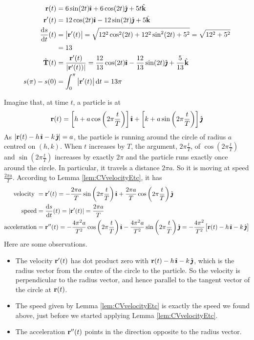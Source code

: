 \begin{eg}
\begin{align*}
\vr(t) &= 6\sin(2t)\hi + 6\cos(2t)\hj +5t\hk \\
\vr'(t) &= 12\cos(2t)\hi -12\sin(2t)\hj +5\hk \\
\diff{s}{t}(t)&=\big|\vr'(t)\big| 
=\sqrt{12^2\cos^2(2t) +12^2\sin^2(2t)+5^2}
= \sqrt{12^2+5^2}\\
& = 13\\
\hat\vT(t) &= \frac{\vr'(t)}{|\vr'(t))|}
               =  \frac{12}{13}\cos(2t)\hi -\frac{12}{13}\sin(2t)\hj +\frac{5}{13}\hk \\
s(\pi)-s(0)&= \int_{0}^\pi \big|\vr'(t)\big|\,\dee{t}
          =13\pi
\end{align*}
\end{eg}

\begin{eg}\label{eg:velAccel}
Imagine that, at time $t$, a particle is at 
\begin{equation*}
\mathbf{r}(t) = \left[h+a\cos\left(2\pi\frac{t}{T}\right)\right]\hat{\pmb{\imath}}
            +\left[k+a\sin\left(2\pi\frac{t}{T}\right)\right]\hat{\pmb{\jmath}}
\end{equation*}
As $|\mathbf{r}(t) -h\,\hat{\pmb{\imath}}-k\,\hat{\pmb{\jmath}}| = a$, the particle is running around the circle of radius $a$ centred on $(h,k)$. When $t$ increases by $T$, the argument, $2\pi\frac{t}{T}$, of $\cos\left(2\pi\tfrac{t}{T}\right)$ and 
$\sin\left(2\pi\tfrac{t}{T}\right)$ increases by exactly $2\pi$ and the particle runs exactly once around the circle. In particular, it travels a distance 
$2\pi a$. So it is moving at speed  $\frac{2\pi a}{T}$. 
According to Lemma \ref{lem:CVvelocityEtc}, it has 
\begin{align*}
\text{velocity }
       &=\vr'(t)=-\frac{2\pi a}{T}\sin\left(2\pi\frac{t}{T}\right)\hi
            +\frac{2\pi a}{T}\cos\left(2\pi\frac{t}{T}\right)\hj
      \\
\text{speed}
       &= \diff{s}{t}(t)=|\vr'(t)|=\frac{2\pi a}{T} \\
\text{acceleration}
       &=\vr''(t)
        =-\frac{4\pi^2 a}{T^2}\cos\left(2\pi\frac{t}{T}\right)\hi
            -\frac{4\pi^2 a}{T^2}\sin\left(2\pi\frac{t}{T}\right)\hj 
        = - \frac{4\pi^2}{T^2}\big[\vr(t) -h\,\hi-k\,\hj\big]
\end{align*}
Here are some observations.
\begin{itemize}
\item 
The velocity $\mathbf{r}'(t)$ has dot product zero with $\mathbf{r}(t) -h\,\hat{\pmb{\imath}}-k\,\hat{\pmb{\jmath}}$, which is the radius vector from the centre of the circle to the particle.
So the velocity is perpendicular to the radius vector, and hence parallel to the 
tangent vector of the circle at $\mathbf{r}(t)$.
\item 
The speed given by Lemma \ref{lem:CVvelocityEtc} is exactly the speed
we found above, just before we started applying Lemma \ref{lem:CVvelocityEtc}.
\item 
The acceleration $\mathbf{r}''(t)$ points in the direction opposite to the radius 
vector.
\end{itemize}


\end{eg}

